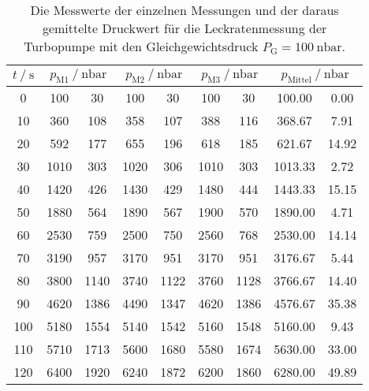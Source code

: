     \begin{table}[h]
      \centering
      \caption{Die Messwerte der einzelnen Messungen und der daraus gemittelte Druckwert für die Leckratenmessung der Turbopumpe mit den Gleichgewichtsdruck $P_\text{G} = \SI{100}{\nano\bar}$.}
      \label{tab:turbo_leck_1}
      \begin{tabular}{S[table-format=3.0] S @{${}\pm{}$} S S @{${}\pm{}$} S S @{${}\pm{}$} S S[table-format=4.2] @{${}\pm{}$} S[table-format=2.2]}
      \toprule
      {$t \mathbin{/} \si{\second} $} &  &  &  &  \\
         &  100 &   30 &  100 &   30 &  100 &   30 &  100.00 &  0.00 \\
      10  &  360 &  108 &  358 &  107 &  388 &  116 &  368.67 &  7.91 \\
      20  &  592 &  177 &  655 &  196 &  618 &  185 &  621.67 & 14.92 \\
      30  & 1010 &  303 & 1020 &  306 & 1010 &  303 & 1013.33 &  2.72 \\
      40  & 1420 &  426 & 1430 &  429 & 1480 &  444 & 1443.33 & 15.15 \\
      50  & 1880 &  564 & 1890 &  567 & 1900 &  570 & 1890.00 &  4.71 \\
      60  & 2530 &  759 & 2500 &  750 & 2560 &  768 & 2530.00 & 14.14 \\
      70  & 3190 &  957 & 3170 &  951 & 3170 &  951 & 3176.67 &  5.44 \\
      80  & 3800 & 1140 & 3740 & 1122 & 3760 & 1128 & 3766.67 & 14.40 \\
      90  & 4620 & 1386 & 4490 & 1347 & 4620 & 1386 & 4576.67 & 35.38 \\
      100 & 5180 & 1554 & 5140 & 1542 & 5160 & 1548 & 5160.00 &  9.43 \\
      110 & 5710 & 1713 & 5600 & 1680 & 5580 & 1674 & 5630.00 & 33.00 \\
      120 & 6400 & 1920 & 6240 & 1872 & 6200 & 1860 & 6280.00 & 49.89 \\
      \bottomrule
      \end{tabular}
    \end{table}


